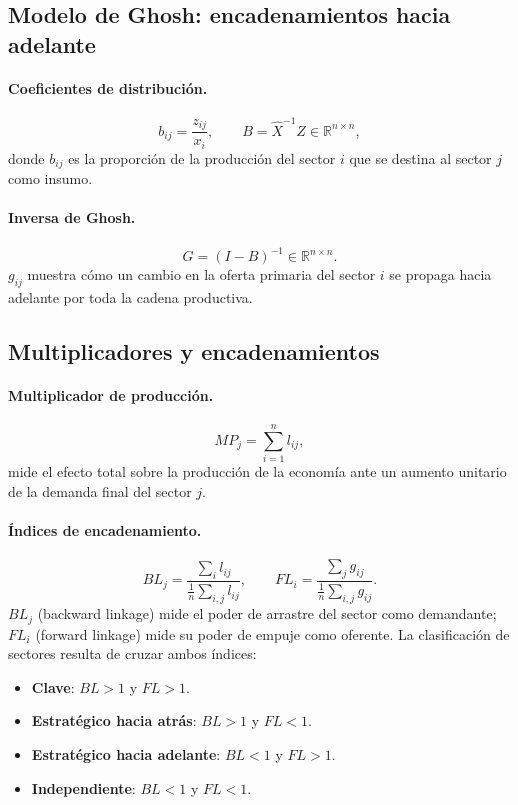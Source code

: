 \documentclass[11pt,a4paper]{article}
\newcommand{\R}{\mathbb{R}}
\begin{document}
\subsection{Modelo de Ghosh: encadenamientos hacia adelante}

\paragraph{Coeficientes de distribución.}
\begin{equation}
b_{ij}=\frac{z_{ij}}{x_i}, \qquad B = \hat{X}^{-1}Z\in\R^{n\times n},
\end{equation}
donde $b_{ij}$ es la proporción de la producción del sector $i$ que se destina al
sector $j$ como insumo.

\paragraph{Inversa de Ghosh.}
\begin{equation}
G=(I-B)^{-1}\in\R^{n\times n}.
\end{equation}
$g_{ij}$ muestra cómo un cambio en la oferta primaria del sector $i$ se propaga
hacia adelante por toda la cadena productiva.

\subsection{Multiplicadores y encadenamientos}

\paragraph{Multiplicador de producción.}
\begin{equation}
MP_j = \sum_{i=1}^{n} l_{ij},
\end{equation}
mide el efecto total sobre la producción de la economía ante un aumento unitario
de la demanda final del sector $j$.

\paragraph{Índices de encadenamiento.}
\begin{equation}
BL_j = \frac{\sum_{i} l_{ij}}{\tfrac{1}{n}\sum_{i,j} l_{ij}},
\qquad
FL_i = \frac{\sum_{j} g_{ij}}{\tfrac{1}{n}\sum_{i,j} g_{ij}}.
\end{equation}
$BL_j$ (backward linkage) mide el poder de arrastre del sector como demandante;
$FL_i$ (forward linkage) mide su poder de empuje como oferente. La clasificación
de sectores resulta de cruzar ambos índices:
\begin{itemize}[leftmargin=1.6em,nosep]
  \item \textbf{Clave}: $BL>1$ y $FL>1$.
  \item \textbf{Estratégico hacia atrás}: $BL>1$ y $FL<1$.
  \item \textbf{Estratégico hacia adelante}: $BL<1$ y $FL>1$.
  \item \textbf{Independiente}: $BL<1$ y $FL<1$.
\end{itemize}
\end{document}
